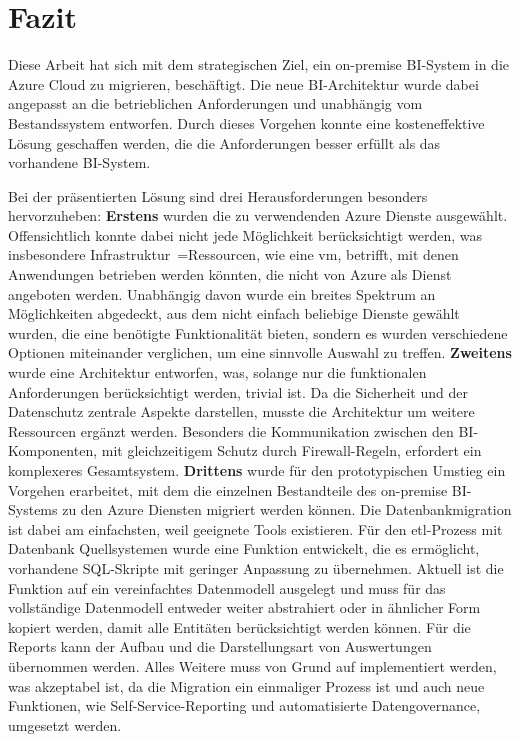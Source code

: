 \chapter{Fazit} \label{ch:zusammenfassung}
Diese Arbeit hat sich mit dem strategischen Ziel, ein on-premise BI-System in die Azure Cloud zu migrieren, beschäftigt. Die neue BI-Architektur wurde dabei angepasst an die betrieblichen Anforderungen und unabhängig vom Bestandssystem entworfen. Durch dieses Vorgehen konnte eine kosteneffektive Lösung geschaffen werden, die die Anforderungen besser erfüllt als das vorhandene BI-System.

Bei der präsentierten Lösung sind drei Herausforderungen besonders hervorzuheben: \textbf{Erstens} wurden die zu verwendenden Azure Dienste ausgewählt. Offensichtlich konnte dabei nicht jede Möglichkeit berücksichtigt werden, was insbesondere Infrastruktur~=Ressourcen, wie eine \ac{vm}, betrifft, mit denen Anwendungen betrieben werden könnten, die nicht von Azure als Dienst angeboten werden. Unabhängig davon wurde ein breites Spektrum an Möglichkeiten abgedeckt, aus dem nicht einfach beliebige Dienste gewählt wurden, die eine benötigte Funktionalität bieten, sondern es wurden verschiedene Optionen miteinander verglichen, um eine sinnvolle Auswahl zu treffen. \textbf{Zweitens} wurde eine Architektur entworfen, was, solange nur die funktionalen Anforderungen berücksichtigt werden, trivial ist. Da die Sicherheit und der Datenschutz zentrale Aspekte darstellen, musste die Architektur um weitere Ressourcen ergänzt werden. Besonders die Kommunikation zwischen den BI-Komponenten, mit gleichzeitigem Schutz durch Firewall-Regeln, erfordert ein komplexeres Gesamtsystem. \textbf{Drittens} wurde für den prototypischen Umstieg ein Vorgehen erarbeitet, mit dem die einzelnen Bestandteile des on-premise BI-Systems zu den Azure Diensten migriert werden können. Die Datenbankmigration ist dabei am einfachsten, weil geeignete Tools existieren. Für den \ac{etl}-Prozess mit Datenbank Quellsystemen wurde eine Funktion entwickelt, die es ermöglicht, vorhandene SQL-Skripte mit geringer Anpassung zu übernehmen. Aktuell ist die Funktion auf ein vereinfachtes Datenmodell ausgelegt und muss für das vollständige Datenmodell entweder weiter abstrahiert oder in ähnlicher Form kopiert werden, damit alle Entitäten berücksichtigt werden können. Für die Reports kann der Aufbau und die Darstellungsart von Auswertungen übernommen werden. Alles Weitere muss von Grund auf implementiert werden, was akzeptabel ist, da die Migration ein einmaliger Prozess ist und auch neue Funktionen, wie Self-Service-Reporting und automatisierte Datengovernance, umgesetzt werden.


